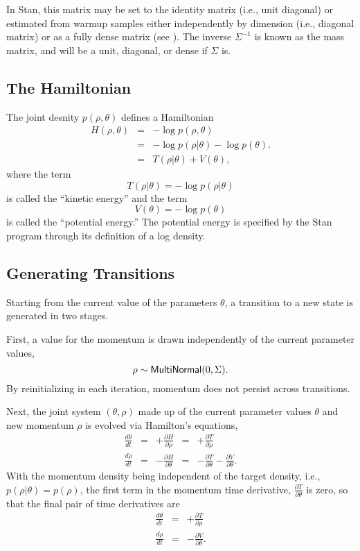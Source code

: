 In Stan, this matrix may be set to the identity matrix (i.e., unit
diagonal) or estimated from warmup samples either independently by
dimension (i.e., diagonal matrix) or as a fully dense matrix (see
). The inverse $\Sigma^{-1}$ is known as
the mass matrix, and will be a unit, diagonal, or dense if $\Sigma$
is.

\subsection{The Hamiltonian}

The joint desnity $p(\rho,\theta)$ defines a Hamiltonian
%
\begin{eqnarray*}
H(\rho,\theta) & = & - \log p(\rho,\theta)
\\[3pt]
& = & - \log p(\rho|\theta) - \log p(\theta).
\\[3pt]
& = & T(\rho|\theta) + V(\theta),
\end{eqnarray*}
%
where the term
\[
T(\rho|\theta) = - \log p(\rho | \theta)
\]
is called the ``kinetic energy'' and the term
\[
V(\theta) = - \log p(\theta)
\]
is called the ``potential energy.''  The potential energy is specified
by the Stan program through its definition of a log density. 

\subsection{Generating Transitions}

Starting from the current value of the parameters $\theta$, a
transition to a new state is generated in two stages.  

First, a value for the momentum is drawn independently of the current
parameter values,
%
\[
\rho \sim \distro{MultiNormal}(0,\Sigma).
\]
%
By reinitializing in each iteration, momentum does not persist across
transitions.

Next, the joint system $(\theta,\rho)$ made up of the current
parameter values $\theta$ and new momentum $\rho$ is evolved
via Hamilton's equations,
%
\[
\begin{array}{rcccl}
\displaystyle
\frac{d\theta}{dt} 
& = &
\displaystyle
+ \frac{\partial H}{\partial \rho} 
& = &
\displaystyle
+ \frac{\partial T}{\partial \rho}
\\[12pt]
\displaystyle
\frac{d\rho}{dt} 
& = & 
\displaystyle
- \frac{\partial H}{\partial \theta } 
& = & 
\displaystyle
- \frac{\partial T}{\partial \theta}
- \frac{\partial V}{\partial \theta}.
\end{array}
\]
%
With the momentum density being independent of the target density,
i.e., $p(\rho|\theta) = p(\rho)$, the first term in the
momentum time derivative, $\frac{\partial T}{\partial \theta}$ is
zero, so that the final pair of time derivatives are 
%
\begin{eqnarray*}
\frac{d \theta}{d t} & = & +\frac{\partial T}{\partial \rho}
\\[2pt]
\frac{d \rho}{d t} & = & -\frac{\partial V}{\partial \theta}.
\end{eqnarray*}

